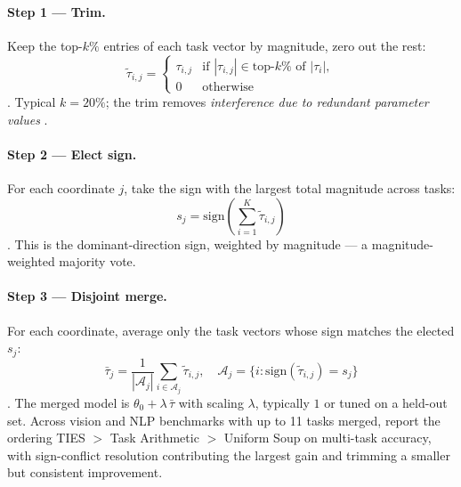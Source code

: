 \paragraph{Step 1 --- Trim.} Keep the top-$k\%$ entries of each task
vector by magnitude, zero out the rest:
\begin{equation}
\tilde\tau_{i,j} =
\begin{cases}
\tau_{i,j} & \text{if } |\tau_{i,j}| \in \text{top-}k\% \text{ of } |\tau_i|,\\
0 & \text{otherwise}
\end{cases}
\label{eq:ties-trim}
\end{equation}
\citep[\S 3, step 1]{yadav2023-ties-merging}. Typical $k = 20\%$; the
trim removes \emph{interference due to redundant parameter values}
\citep[abstract]{yadav2023-ties-merging}.

\paragraph{Step 2 --- Elect sign.} For each coordinate $j$, take the
sign with the largest total magnitude across tasks:
\begin{equation}
s_j = \mathrm{sign}\!\left(\sum_{i=1}^K \tilde\tau_{i,j}\right)
\label{eq:ties-sign}
\end{equation}
\citep[\S 3, step 2]{yadav2023-ties-merging}. This is the
dominant-direction sign, weighted by magnitude — a magnitude-weighted
majority vote.

\paragraph{Step 3 --- Disjoint merge.} For each coordinate, average
only the task vectors whose sign matches the elected $s_j$:
\begin{equation}
\bar\tau_j = \frac{1}{|\mathcal{A}_j|}\sum_{i \in \mathcal{A}_j} \tilde\tau_{i,j},
\quad
\mathcal{A}_j = \{i : \mathrm{sign}(\tilde\tau_{i,j}) = s_j\}
\label{eq:ties-merge}
\end{equation}
\citep[\S 3, step 3]{yadav2023-ties-merging}. The merged model is
$\theta_0 + \lambda\, \bar\tau$ with scaling $\lambda$, typically $1$ or
tuned on a held-out set. Across vision and NLP benchmarks with up to
11 tasks merged, \citet[\S 4]{yadav2023-ties-merging} report the
ordering TIES $>$ Task Arithmetic $>$ Uniform Soup on multi-task
accuracy, with sign-conflict resolution contributing the largest gain
and trimming a smaller but consistent improvement.


